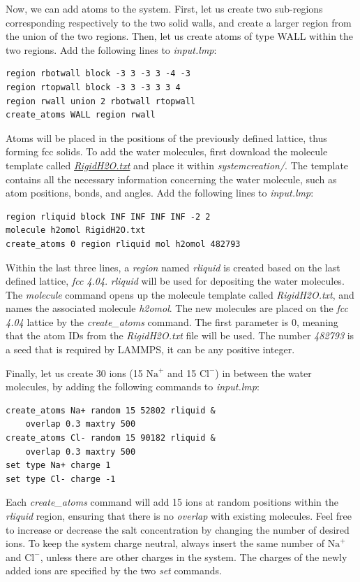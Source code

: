 \documentclass[9pt,tutorial]{livecoms}
\begin{document}
Now, we can add atoms to the system. First, let us create two sub-regions corresponding
respectively to the two solid walls, and create a larger region from the union of the
two regions. Then, let us create atoms of type WALL within the two regions. Add the
following lines to \textit{input.lmp}:
{\normalsize \begin{verbatim}
region rbotwall block -3 3 -3 3 -4 -3
region rtopwall block -3 3 -3 3 3 4
region rwall union 2 rbotwall rtopwall
create_atoms WALL region rwall
\end{verbatim}}
Atoms will be placed in the positions of the previously defined lattice, thus
forming fcc solids. To add the water molecules, first download the molecule
template called \href{https://raw.githubusercontent.com/lammpstutorials/lammpstutorials-article/main/files/tutorial4/RigidH2O.txt}{\textit{RigidH2O.txt}}
and place it within \textit{systemcreation/}. The template contains all the
necessary information concerning the water molecule, such as atom positions,
bonds, and angles. Add the following lines to \textit{input.lmp}:
{\normalsize \begin{verbatim}
region rliquid block INF INF INF INF -2 2
molecule h2omol RigidH2O.txt
create_atoms 0 region rliquid mol h2omol 482793
\end{verbatim}}
Within the last three lines, a \textit{region} named \textit{rliquid} is
created based on the last defined lattice, \textit{fcc 4.04}. \textit{rliquid}
will be used for depositing the water molecules. The \textit{molecule} command
opens up the molecule template called \textit{RigidH2O.txt}, and names the
associated molecule \textit{h2omol}. The new molecules are placed on the
\textit{fcc 4.04} lattice by the \textit{create\_atoms} command. The first
parameter is 0, meaning that the atom IDs from the \textit{RigidH2O.txt} file
will be used. The number \textit{482793} is a seed that is required by LAMMPS,
it can be any positive integer.

Finally, let us create 30 ions (15 $\text{Na}^+$ and 15 $\text{Cl}^-$) in between
the water molecules, by adding the following commands to \textit{input.lmp}:
{\normalsize \begin{verbatim}
create_atoms Na+ random 15 52802 rliquid &
    overlap 0.3 maxtry 500
create_atoms Cl- random 15 90182 rliquid &
    overlap 0.3 maxtry 500
set type Na+ charge 1
set type Cl- charge -1
\end{verbatim}}
Each \textit{create\_atoms} command will add 15 ions at random positions
within the \textit{rliquid} region, ensuring that there is no \textit{overlap}
with existing molecules. Feel free to increase or decrease the salt concentration
by changing the number of desired ions. To keep the system charge neutral,
always insert the same number of $\text{Na}^+$ and $\text{Cl}^-$, unless there
are other charges in the system. The charges of the newly added ions are specified
by the two \textit{set} commands.
\end{document}
